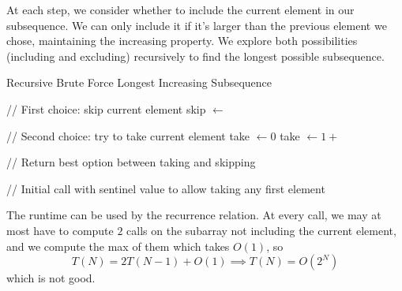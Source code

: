   \begin{algo}
    At each step, we consider whether to include the current element in our subsequence. We can only include it if it's larger than the previous element we chose, maintaining the increasing property. We explore both possibilities (including and excluding) recursively to find the longest possible subsequence.
    \begin{algorithm}[H]
      \caption{Recursive Brute Force Longest Increasing Subsequence}
      \label{alg:reclis}
      \begin{algorithmic}
          
            
            \State {}  
          \EndIf

          \State // First choice: skip current element
          \State skip $\gets$   

          \State // Second choice: try to take current element
          \State take $\gets 0$  
            
            \State take $\gets 1 +$   
          \EndIf {}

          \State // Return best option between taking and skipping
          \State {}  
        \EndFunction
        
        \State // Initial call with sentinel value to allow taking any first element
        \State {}  
      \end{algorithmic}
    \end{algorithm}
    The runtime can be used by the recurrence relation. At every call, we may at most have to compute $2$ calls on the subarray not including the current element, and we compute the max of them which takes $O(1)$, so 
    \begin{equation}
      T(N) = 2 T(N-1) + O(1) \implies T(N) = O(2^N)
    \end{equation}
    which is not good. 
  \end{algo}


